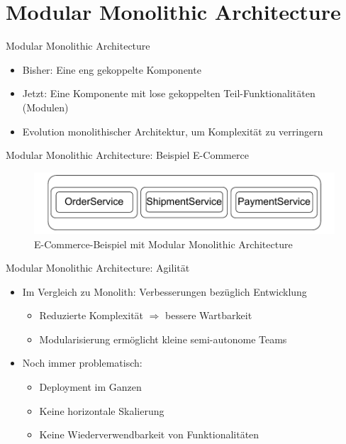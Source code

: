 \section{Modular Monolithic Architecture}

\begin{frame}{Modular Monolithic Architecture}
    \begin{itemize}
        \item Bisher: Eine eng gekoppelte Komponente
        \item Jetzt: Eine Komponente mit lose gekoppelten Teil-Funktionalitäten (Modulen)
        \item Evolution monolithischer Architektur, um Komplexität zu verringern
    \end{itemize}
\end{frame}

\begin{frame}{Modular Monolithic Architecture: Beispiel E-Commerce}
    \begin{figure}[!h]
        \centering
        \includegraphics[scale=0.70]{imglib/mono/mono-example}
        \caption{E-Commerce-Beispiel mit Modular Monolithic Architecture}
        \label{fig:mono-modular}
    \end{figure}
\end{frame}

\begin{frame}{Modular Monolithic Architecture: Agilität}
    \begin{itemize}
        \item Im Vergleich zu Monolith: Verbesserungen bezüglich Entwicklung
        \begin{itemize}
            \item Reduzierte Komplexität $\Rightarrow$ bessere Wartbarkeit
            \item Modularisierung ermöglicht kleine semi-autonome Teams
        \end{itemize}
        \item Noch immer problematisch:
        \begin{itemize}
            \item Deployment im Ganzen
            \item Keine horizontale Skalierung
            \item Keine Wiederverwendbarkeit von Funktionalitäten
        \end{itemize}
    \end{itemize}
\end{frame}
